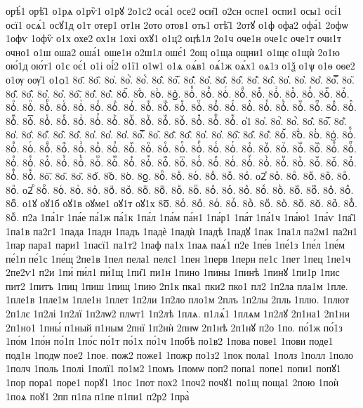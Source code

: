 {орѣ́1
орѣ̑1
о1рѧ
о1рѷ1
о1рꙋ
2о1с2
оса́1
осе2
оси̑1
о2сн
оспе1
оспи1
осы1
осі́1
осї1
осѧ́1
осꙋ1д
о1т
отер1
от1н
2ото
отов1
оть1
отѣ̑1
2отꙋ
о1ф
офа2
офа́1
2офѡ
1офѵ
1офѷ
о1х
охе2
ох1н
1охі
охꙋ1
о1ц2
оцѣ1л
2о1ч
оче1н
оче1с
оче1т
очи1т
очно1
о1ш
оша2
оша́1
оше1н
о2ш1л
ошє́1
2ощ
о1ща
ощни1
о1щє
о1щѝ
2о1ю
ою́1д
ою́т1
о1є
оє́1
о1і
оі́2
о1ї1
о1ѡ1
о1ѧ
оѧ́в1
оѧ́1ж
оѧ́х1
оѧ1з
о1ѯ
о1ѱ
о1ѳ
оѳе2
о1ѹ
оѹ҆1
о1ѻ1
8о҃.
8о҄.
8о҅.
8о҅̀.
8о҅́.
8о҅̂.
8о҅̅.
8о҅̆.
8о҅̇.
8о҅̈.
8о҅̋.
8о҅̏.
8о҅̑.
8о҅̓.
8о҅̔.
8о҅̾.
8о҅̿.
8о҅͘.
8о҅҃.
8о҅҄.
8о҅҅.
8о҅҆.
8о҅҇.
8о҅᷀.
8о҅᷁.
8о҅᷶.
8о᷷҅.
8о᷸҅.
8о᷹҅.
8о҅ⷠ.
8о҅ⷡ.
8о҅ⷢ.
8о҅ⷣ.
8о҅ⷤ.
8о҅ⷥ.
8о҅ⷦ.
8о҅ⷧ.
8о҅ⷨ.
8о҅ⷩ.
8о҅ⷪ.
8о҅ⷫ.
8о҅ⷬ.
8о҅ⷭ.
8о҅ⷮ.
8о҅ⷯ.
8о҅ⷰ.
8о҅ⷱ.
8о҅ⷲ.
8о҅ⷳ.
8о҅ⷴ.
8о҅ⷵ.
8о҅ⷶ.
8о҅ⷷ.
8о҅ⷸ.
8о҅ⷹ.
8о҅ⷺ.
8о҅ⷻ.
8о҅ⷼ.
8о҅ⷽ.
8о҅ⷾ.
8о҅ⷿ.
8о҅꙯.
8о҅ꙴ.
8о҅ꙵ.
8о҅ꙶ.
8о҅ꙷ.
8о҅ꙸ.
8о҅ꙹ.
8о҅ꙺ.
8о҅ꙻ.
8о҅꙼.
8о҅꙽.
8о҅ꚞ.
8о҅ꚟ.
о҆1
8о҆.
8о҆̀.
8о҆́.
8о҆̂.
8о҆̅.
8о҆̆.
8о҆̇.
8о҆̈.
8о҆̋.
8о҆̏.
8о҆̑.
8о҆̓.
8о҆̔.
8о҆̾.
8о҆̿.
8о҆͘.
8о҆҃.
8о҆҄.
8о҆҅.
8о҆҆.
8о҆҇.
8о҆᷀.
8о҆᷁.
8о҆᷶.
8о᷷҆.
8о᷸҆.
8о᷹҆.
8о҆ⷠ.
8о҆ⷡ.
8о҆ⷢ.
8о҆ⷣ.
8о҆ⷤ.
8о҆ⷥ.
8о҆ⷦ.
8о҆ⷧ.
8о҆ⷨ.
8о҆ⷩ.
8о҆ⷪ.
8о҆ⷫ.
8о҆ⷬ.
8о҆ⷭ.
8о҆ⷮ.
8о҆ⷯ.
8о҆ⷰ.
8о҆ⷱ.
8о҆ⷲ.
8о҆ⷳ.
8о҆ⷴ.
8о҆ⷵ.
8о҆ⷶ.
8о҆ⷷ.
8о҆ⷸ.
8о҆ⷹ.
8о҆ⷺ.
8о҆ⷻ.
8о҆ⷼ.
8о҆ⷽ.
8о҆ⷾ.
8о҆ⷿ.
8о҆꙯.
8о҆ꙴ.
8о҆ꙵ.
8о҆ꙶ.
8о҆ꙷ.
8о҆ꙸ.
8о҆ꙹ.
8о҆ꙺ.
8о҆ꙻ.
8о҆꙼.
8о҆꙽.
8о҆ꚞ.
8о҆ꚟ.
8о҇.
8о᷀.
8о᷁.
8о᷶.
8о᷷.
8о᷸.
8о᷹.
8оⷠ.
8оⷡ.
8оⷢ.
8оⷣ.
8оⷤ.
8оⷥ.
о2ⷦ
8оⷦ.
8оⷧ.
8оⷨ.
8оⷩ.
8оⷪ.
8оⷫ.
о2ⷬ
8оⷬ.
8оⷭ.
8оⷮ.
8оⷯ.
8оⷰ.
8оⷱ.
8оⷲ.
8оⷳ.
8оⷴ.
8оⷵ.
8оⷶ.
8оⷷ.
8оⷸ.
8оⷹ.
8оⷺ.
8оⷻ.
8оⷼ.
8оⷽ.
8оⷾ.
8оⷿ.
о1ꙋ
оꙋ1б
оꙋ1в
оꙋме1
оꙋ1т
оꙋ1х
8о꙯.
8оꙴ.
8оꙵ.
8оꙶ.
8оꙷ.
8оꙸ.
8оꙹ.
8оꙺ.
8оꙻ.
8о꙼.
8о꙽.
8оꚞ.
8оꚟ.
п2а
1па́1г
1па́е
па́1ж
па́1к
1па́л
1па́м
па́н1
1па́р1
1па́т
1па́1ч
1па́ю1
1па́ѵ
1па̑1
1па1в
па2г1
1пада
1падн
1падъ
1падѐ
1падѝ
1падѣ
1падꙋ
1пак
1па1л
па2м1
па2н1
1пар
пара1
пари1
1пасї1
па1т2
1паф
па1х
1паѧ
паѧ́1
п2е
1пе́в
1пе́1з
1пе́л
1пе́м
пе́1п
пе́1с
1пе́щ
2пе1в
1пел
пела1
пелє1
1пен
1перв
1перн
пе1с
1пет
1пец
1пе1ч
2пе2ѵ1
п2и
1пи́
пи́л1
пи́1щ
1пи̑1
пи1н
1пино
1пины
1пинѣ
1пинꙋ
1пи1р
1пис
пит2
1питъ
1пиц
1пиш
1пищ
1пию
2п1к
пка1
пки2
пко1
пл2
1п2ла
пла1м
1пле.
1пле1в
1пле1м
1пле1н
1плет
1п2ли
1п2ло
пло1м
2плъ
1п2лы
2пль
1плю.
1плют
2п1лє
1п2лі
1п2лї
1п2лѡ2
плѡт1
1п2лѣ
1плѧ.
п1лѧ́1
1плѧм
1п2лꙋ
2п1на1
2п1ни
2п1но1
1пны́
п1ный
п1ным
2пнї
1п2нѝ
2пнѡ
2п1нѣ
2п1нꙋ
п2о
1по.
по́1ж
по́1з
1по́м
1по́н
по́1п
1по́с
по́1т
по́1х
по́1ч
1побѣ
по1в2
1пова
пове1
1пови
поде1
под1н
1подѡ
пое2
1пое.
пож2
поже1
1пожр
по1з2
1пок
пола1
1полз
1полл
1поло
1полч
1поль
1полі
1полї1
по1м2
1помъ
1помѡ
поп2
попа1
попе1
попи1
попꙋ1
1пор
пора1
поре1
порꙋ1
1пос
1пот
пох2
1поч2
почꙋ1
по1щ
поща1
2пою
1поѝ
1поѧ
поꙋ1
2пп
п1па
п1пе
п1пи1
п2р2
1пра̀
}
